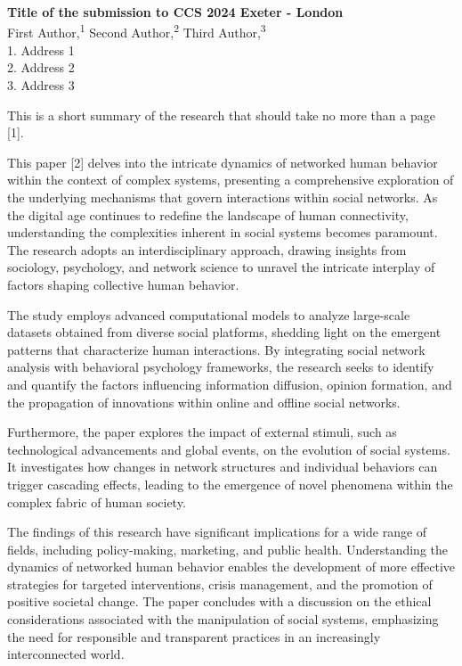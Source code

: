 \documentclass[11pt]{article}
\renewcommand{\title}[1]{{\noindent\large\bfseries#1\medskip\\}}
\renewcommand{\author}[2]{{\noindent #1 \medskip\\ \small #2 \medskip\\}}
\begin{document}
\title{Title of the submission to CCS 2024 Exeter - London}
\author{
First Author,\textsuperscript{1}
Second Author,\textsuperscript{2}
Third Author,\textsuperscript{3}
}
{
1. Address 1\\
2. Address 2\\
3. Address 3
}

This is a short summary of the research that should take no more than a page [1].

This paper [2] delves into the intricate dynamics of networked human behavior within the context of complex systems, presenting a comprehensive exploration of the underlying mechanisms that govern interactions within social networks. As the digital age continues to redefine the landscape of human connectivity, understanding the complexities inherent in social systems becomes paramount. The research adopts an interdisciplinary approach, drawing insights from sociology, psychology, and network science to unravel the intricate interplay of factors shaping collective human behavior.

The study employs advanced computational models to analyze large-scale datasets obtained from diverse social platforms, shedding light on the emergent patterns that characterize human interactions. By integrating social network analysis with behavioral psychology frameworks, the research seeks to identify and quantify the factors influencing information diffusion, opinion formation, and the propagation of innovations within online and offline social networks.

Furthermore, the paper explores the impact of external stimuli, such as technological advancements and global events, on the evolution of social systems. It investigates how changes in network structures and individual behaviors can trigger cascading effects, leading to the emergence of novel phenomena within the complex fabric of human society.

The findings of this research have significant implications for a wide range of fields, including policy-making, marketing, and public health. Understanding the dynamics of networked human behavior enables the development of more effective strategies for targeted interventions, crisis management, and the promotion of positive societal change. The paper concludes with a discussion on the ethical considerations associated with the manipulation of social systems, emphasizing the need for responsible and transparent practices in an increasingly interconnected world.
\end{document}
